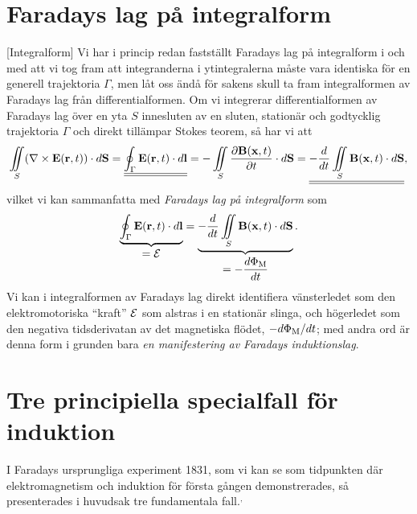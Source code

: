 \section{Faradays lag p{\aa} integralform}
[Integralform]
Vi har i princip redan fastst{\"a}llt Faradays lag p{\aa} integralform i och
med att vi tog fram att inte\-grand\-erna i ytintegralerna m{\aa}ste vara
identiska f{\"o}r en generell trajektoria $\Gamma$, men l{\aa}t oss
{\"a}nd{\aa} f{\"o}r sakens skull ta fram integralformen av Faradays lag
fr{\aa}n differentialformen.
Om vi integrerar differentialformen av Faradays lag {\"o}ver en yta $S$
innesluten av en sluten, station{\"a}r och godtycklig trajektoria $\Gamma$
och direkt till{\"a}mpar Stokes teorem, s{\aa} har vi att
$$
  \iint_S(\nabla\times{\bf E}({\bf r},t))\cdot d{\bf S}
  =\underline{\underline{
     \oint_{\Gamma}{\bf E}({\bf r},t)\cdot d{\bf l}
   }}
  =-\iint_S{{\partial{\bf B}({\bf x},t)}\over{\partial t}}\cdot d{\bf S}
  =\underline{\underline{
     -{{d}\over{dt}}\iint_S{\bf B}({\bf x},t)\cdot d{\bf S}
   }},
$$
vilket vi kan sammanfatta med {\it Faradays lag p{\aa} integralform} som
$$
  \underbrace{
    \oint_{\Gamma}{\bf E}({\bf r},t)\cdot d{\bf l}
  }_{\displaystyle ={\cal E}}
    =\underbrace{
       -{{d}\over{dt}}\iint_S{\bf B}({\bf x},t)\cdot d{\bf S}
     }_{\displaystyle =-{{d\Phi_{\rm M}}\over{dt}}}.
$$
Vi kan i integralformen av Faradays lag direkt identifiera v{\"a}nsterledet som
den elektromotoriska ``kraft'' ${\cal E}$ som alstras i en station{\"a}r slinga,
och h{\"o}gerledet som den negativa tidsderivatan av det magnetiska fl{\"o}det,
$-d\Phi_{\rm M}/dt$; med andra ord {\"a}r denna form i grunden bara
{\it en manifestering av Faradays induktionslag}.

\section{Tre principiella specialfall f{\"o}r induktion}
I Faradays ursprungliga experiment 1831, som vi kan se som tidpunkten d{\"a}r
elektromagnetism och induktion f{\"o}r f{\"o}rsta g{\aa}ngen demonstrerades,
s{\aa} presenterades i huvudsak tre fundamentala
fall.${^{,}}$%

